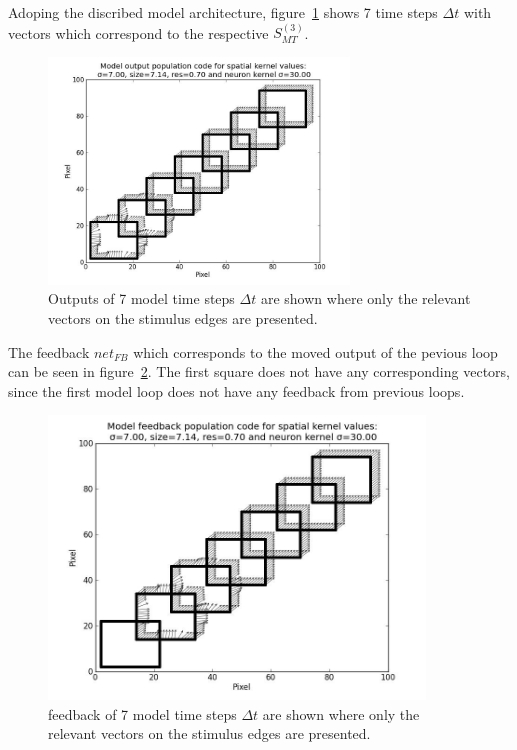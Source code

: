 \documentclass[a4paper]{article}
\begin{document}
Adoping the discribed model architecture, figure~\ref{fig:output} shows 7 time steps $\Delta t$ with vectors which correspond to the respective $S^{(3)}_{MT}$.

\vspace{0.5cm}
\begin{figure}[ht]
\centering
\includegraphics[width=8cm]{pics/output}
\caption{Outputs of 7 model time steps $\Delta t$ are shown where only the relevant vectors on the stimulus edges are presented.}
\label{fig:output}
\end{figure}
\vspace{0.5cm}

The feedback $net_{FB}$ which corresponds to the moved output of the pevious loop can be seen in figure~\ref{fig:feedback}. The first square does not have any corresponding vectors, since the first model loop does not have any feedback from previous loops.
\newpage
\begin{figure}[ht]
\centering
\includegraphics[width=10cm]{pics/feedback}
\caption{feedback of 7 model time steps $\Delta t$ are shown where only the relevant vectors on the stimulus edges are presented.}
\label{fig:feedback}
\end{figure}
\vspace{0.5cm}
\end{document}
